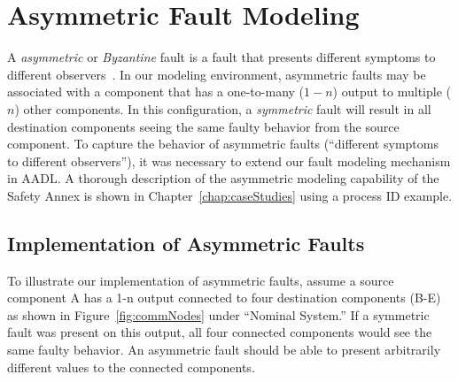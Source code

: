 \section{Asymmetric Fault Modeling}
\label{sec:byzantine}
A \textit{asymmetric} or \textit{Byzantine} fault is a fault that presents different symptoms to different observers~\cite{Driscoll-Byzantine-Fault}. In our modeling environment, asymmetric faults may be associated with a component that has a one-to-many ($1-n$) output to multiple ($n$) other components. In this configuration, a \textit{symmetric} fault will result in all destination components seeing the same faulty behavior from the source component. To capture the behavior of asymmetric faults (``different symptoms to different observers''), it was necessary to extend our fault modeling mechanism in AADL. A thorough description of the asymmetric modeling capability of the Safety Annex is shown in Chapter~\ref{chap:caseStudies} using a process ID example.

\subsection{Implementation of Asymmetric Faults}
To illustrate our implementation of asymmetric faults, assume a source component A has a 1-n output connected to four destination components (B-E) as shown in Figure~\ref{fig:commNodes} under ``Nominal System.'' If a symmetric fault was present on this output, all four connected components would see the same faulty behavior. An asymmetric fault should be able to present arbitrarily different values to the connected components. 

